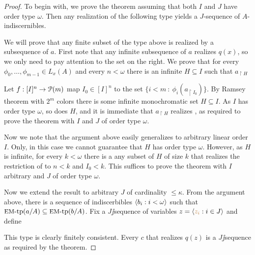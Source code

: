 \documentclass[creche.tex]{subfiles}
\begin{document}
\begin{proof}
  To begin with, we prove the theorem assuming that both $I$ and $J$ have order type $\omega$. Then any realization of the following type yields a $J$-sequence of $A$-indiscernibles. 


  We will prove that any finite subset of the type above is realized by a subsequence of $a$. First note that any infinite subsequence of $a$ realizes $q(x)$, so we only need to pay attention to the set on the right. We prove that for every $\phi_0,\dots,\phi_{m-1}\in L_x(A)$ and every $n<\omega$ there is an infinite $H\subseteq I$ such that $a_{\restriction H}$


  Let $f:[I]^n\to\P(m)$ map $I_0\in[I]^n$ to the set $\big\{i<m\ :\ \phi_i(a_{\restriction I_0})\big\}$. By Ramsey theorem with $2^m$ colors there is some infinite monochromatic set $H\subseteq I$. As $I$ has order type $\omega$, so does $H$, and it is immediate that $a_{\restriction H}$ realizes \ssf{\#}, as required to prove the theorem with $I$ and $J$ of order type $\omega$.

  Now we note that the argument above easily generalizes to arbitrary linear order $I$. Only, in this case we cannot guarantee that $H$ has order type $\omega$. However, as $H$ is infinite, for every $k<\omega$ there is a any subset of $H$ of size $k$ that realizes the restriction of \ssf{\#} to $n<k$ and $I_0<k$. This suffices to prove the theorem with $I$ arbitrary and $J$ of order type $\omega$.
  
  Now we extend the result to arbitrary $J$ of cardinality $\le\kappa$. From the argument above, there is a sequence of indiscerbibles $\<b_i:i<\omega\>$ such that $\EMtp(a/A)\subseteq\EMtp(b/A)$. Fix a $J\jj$sequence of variables $z=\<{\mr z_i}:i\in J\>$ and define

  
  This type is clearly finitely consistent. Every $c$ that realizes $q(z)$ is a $J\jj$sequence as required by the theorem. 
  \end{proof}
\end{document}
